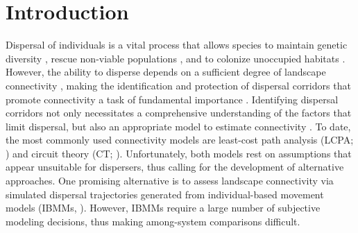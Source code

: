 \documentclass[abstract=on,10pt,a4paper,bibliography=totocnumbered]{article}
\begin{document}
\newpage

\doublespacing

\newpage
{}

\linenumbers

\section{Introduction}

Dispersal of individuals is a vital process that allows species to maintain
genetic diversity \citep{Perrin.2000, Frankham.2002, Leigh.2012, Baguette.2013,
LaPoint.2013}, rescue non-viable populations \citep{Brown.1977}, and to colonize
unoccupied habitats \citep{Hanski.1999b, MacArthur.2001}. However, the ability
to disperse depends on a sufficient degree of landscape connectivity
\citep{Fahrig.2003, Clobert.2012}, making the identification and protection of
dispersal corridors that promote connectivity a task of fundamental importance
\citep{Doerr.2011, Rudnick.2012}. Identifying dispersal corridors not only
necessitates a comprehensive understanding of the factors that limit dispersal,
but also an appropriate model to estimate connectivity \citep{Baguette.2013,
Vasudev.2015, Hofmann.2021}. To date, the most commonly used connectivity models
are least-cost path analysis (LCPA; \citealp{Adriaensen.2003}) and circuit
theory (CT; \citealp{McRae.2006, McRae.2008}). Unfortunately, both models rest
on assumptions that appear unsuitable for dispersers, thus calling for the
development of alternative approaches. One promising alternative is to assess
landscape connectivity via simulated dispersal trajectories generated from
individual-based movement models (IBMMs, \citealp{Diniz.2019}). However, IBMMs
require a large number of subjective modeling decisions, thus making
among-system comparisons difficult.
\end{document}
